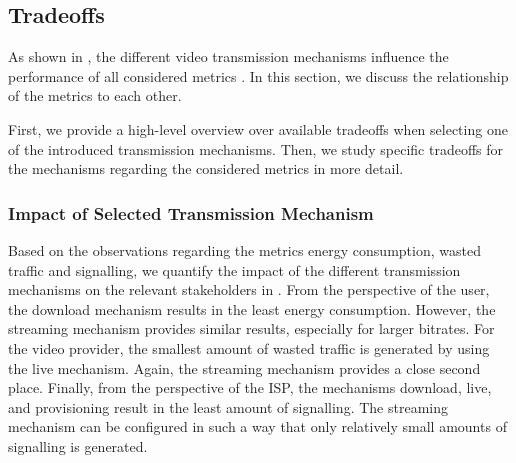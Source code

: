 \subsection{Tradeoffs}\label{sec:application:lte_video:trade_offs}
As shown in , the different video transmission mechanisms influence the performance of all considered metrics . 
In this section, we discuss the relationship of the metrics to each other.

First, we provide a high-level overview over available tradeoffs when selecting one of the introduced transmission mechanisms.
Then, we study specific tradeoffs for the \streaming mechanisms regarding the considered metrics in more detail.

\subsubsection*{Impact of Selected Transmission Mechanism}\label{sec:application:lte_video:trade_offs:mechanism_selection}

Based on the observations regarding the metrics energy consumption, wasted traffic and signalling, we quantify the impact of the different transmission mechanisms on the relevant stakeholders in .
From the perspective of the user, the download mechanism results in the least energy consumption.
However, the streaming mechanism provides similar results, especially for larger bitrates.
For the video provider, the smallest amount of wasted traffic is generated by using the live mechanism.
Again, the streaming mechanism provides a close second place.
Finally, from the perspective of the \gls{ISP}, the mechanisms download, live, and provisioning result in the least amount of signalling.
The streaming mechanism can be configured in such a way that only relatively small amounts of signalling is generated.

